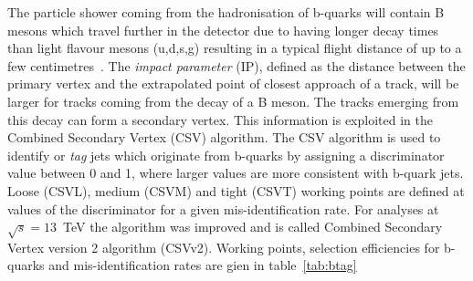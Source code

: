 The particle shower coming from the hadronisation of b-quarks will contain B mesons which travel further in the detector due to having longer decay times than light flavour mesons (u,d,s,g) resulting in a typical flight distance of up to a few centimetres~\cite{Collaboration2015BS0}. The \emph{impact parameter} (IP), defined as the distance between the primary vertex and the extrapolated point of closest approach of a track, will be larger for tracks coming from the decay of a B meson. The tracks emerging from this decay can form a secondary vertex. This information is exploited in the Combined Secondary Vertex (CSV) algorithm. The CSV algorithm is used to identify or \emph{tag} jets which originate from b-quarks by assigning a discriminator value between 0 and 1, where larger values are more consistent with b-quark jets. Loose (CSVL), medium (CSVM) and tight (CSVT) working points are defined at values of the discriminator for a given mis-identification rate. For analyses at $\sqrt{s} = 13$~TeV the algorithm was improved and is called Combined Secondary Vertex version 2 algorithm (CSVv2). Working points, selection efficiencies for b-quarks and mis-identification rates are gien in table~\ref{tab:btag} 


